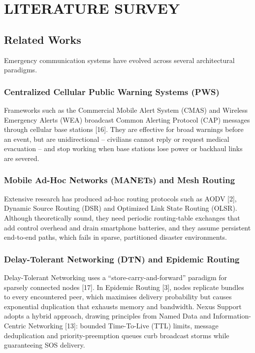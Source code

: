\documentclass[12pt,a4paper]{report}
\begin{document}
\chapter{LITERATURE SURVEY}

\section{Related Works}
Emergency communication systems have evolved across several architectural paradigms.

\subsection{Centralized Cellular Public Warning Systems (PWS)}
Frameworks such as the Commercial Mobile Alert System (CMAS) and Wireless Emergency Alerts (WEA) broadcast Common Alerting Protocol (CAP) messages through cellular base stations [16]. They are effective for broad warnings before an event, but are unidirectional -- civilians cannot reply or request medical evacuation -- and stop working when base stations lose power or backhaul links are severed.

\subsection{Mobile Ad-Hoc Networks (MANETs) and Mesh Routing}
Extensive research has produced ad-hoc routing protocols such as AODV [2], Dynamic Source Routing (DSR) and Optimized Link State Routing (OLSR). Although theoretically sound, they need periodic routing-table exchanges that add control overhead and drain smartphone batteries, and they assume persistent end-to-end paths, which fails in sparse, partitioned disaster environments.

\subsection{Delay-Tolerant Networking (DTN) and Epidemic Routing}
Delay-Tolerant Networking uses a ``store-carry-and-forward'' paradigm for sparsely connected nodes [17]. In Epidemic Routing [3], nodes replicate bundles to every encountered peer, which maximises delivery probability but causes exponential duplication that exhausts memory and bandwidth. Nexus Support adopts a hybrid approach, drawing principles from Named Data and Information-Centric Networking [13]: bounded Time-To-Live (TTL) limits, message deduplication and priority-preemption queues curb broadcast storms while guaranteeing SOS delivery.
\end{document}
